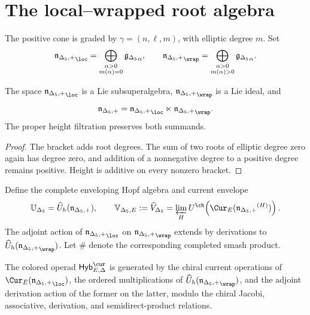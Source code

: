 \chapter{The local--wrapped root algebra}
The positive cone is graded by $\gamma=(n,\ell,m)$, with elliptic degree $m$.  Set
\[
 \nIg_{\loc}=\bigoplus_{\substack{\alpha>0\\m(\alpha)=0}}\gIg_\alpha,
 \qquad
 \nIg_{\wrap}=\bigoplus_{\substack{\alpha>0\\m(\alpha)>0}}\gIg_\alpha.
\]

\begin{proposition}
The space $\nIg_{\loc}$ is a Lie subsuperalgebra, $\nIg_{\wrap}$ is a Lie ideal, and
\[
 \nIg=\nIg_{\loc}\ltimes\nIg_{\wrap}.
\]
The proper height filtration preserves both summands.
\end{proposition}
\begin{proof}
The bracket adds root degrees.  The sum of two roots of elliptic degree zero again has degree zero, and addition of a nonnegative degree to a positive degree remains positive.  Height is additive on every nonzero bracket.
\end{proof}

Define the complete enveloping Hopf algebra and current envelope
\[
 \mathbb U_{\Delta_5}=\widehat U_h(\nIg),
 \qquad
 \mathbb V_{\Delta_5,E}:=\widehat V_{\Delta_5}=\varprojlim_HU^{\ch}\!\left(\Cur_E(\nIg^{(H)})\right).
\]
The adjoint action of $\nIg_{\loc}$ on $\nIg_{\wrap}$ extends by derivations to $\widehat U_h(\nIg_{\wrap})$.  Let $\# $ denote the corresponding completed smash product.

\begin{definition}
The colored operad $\mathsf{Hyb}^{\cur}_{E,\Delta}$ is generated by the chiral current operations of $\Cur_E(\nIg_{\loc})$, the ordered multiplications of $\widehat U_h(\nIg_{\wrap})$, and the adjoint derivation action of the former on the latter, modulo the chiral Jacobi, associative, derivation, and semidirect-product relations.
\end{definition}


